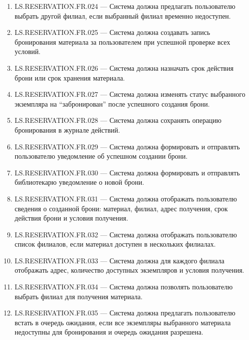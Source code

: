 \documentclass[12pt,a4paper]{article}
\begin{document}
\begin{enumerate}
		\item LS.RESERVATION.FR.024 --- Система должна предлагать пользователю выбрать
		другой филиал, если выбранный филиал временно недоступен.
		
		\item LS.RESERVATION.FR.025 --- Система должна создавать запись бронирования
		материала за пользователем при успешной проверке всех условий.
		
		\item LS.RESERVATION.FR.026 --- Система должна назначать срок действия брони
		или срок хранения материала.
		
		\item LS.RESERVATION.FR.027 --- Система должна изменять статус выбранного
		экземпляра на ``забронирован'' после успешного создания брони.
		
		\item LS.RESERVATION.FR.028 --- Система должна сохранять операцию бронирования
		в журнале действий.
		
		\item LS.RESERVATION.FR.029 --- Система должна формировать и отправлять
		пользователю уведомление об успешном создании брони.
		
		\item LS.RESERVATION.FR.030 --- Система должна формировать и отправлять
		библиотекарю уведомление о новой брони.
		
		\item LS.RESERVATION.FR.031 --- Система должна отображать пользователю сведения
		о созданной брони: материал, филиал, адрес получения, срок действия брони и
		условия получения.
		
		\item LS.RESERVATION.FR.032 --- Система должна отображать пользователю список
		филиалов, если материал доступен в нескольких филиалах.
		
		\item LS.RESERVATION.FR.033 --- Система должна для каждого филиала отображать
		адрес, количество доступных экземпляров и условия получения.
		
		\item LS.RESERVATION.FR.034 --- Система должна позволять пользователю выбрать
		филиал для получения материала.
		
		\item LS.RESERVATION.FR.035 --- Система должна предлагать пользователю встать
		в очередь ожидания, если все экземпляры выбранного материала недоступны для
		бронирования и очередь ожидания разрешена.
		

\end{enumerate}
\end{document}
